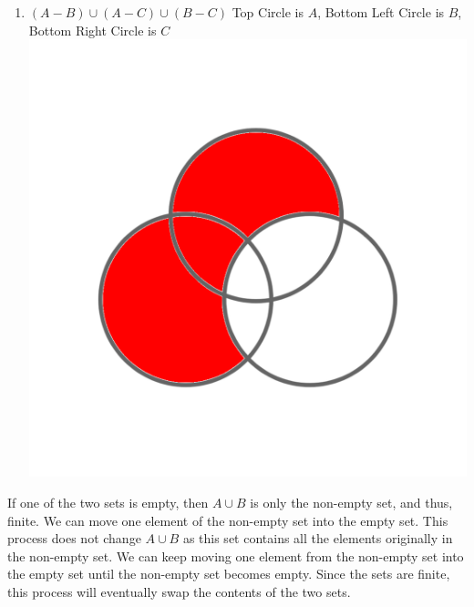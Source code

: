 \documentclass[12pt]{article}  %
\begin{document}
\begin{enumerate}
    \item $(A-B)\cup(A-C)\cup(B-C)$
    \newline
        Top Circle is $A$, Bottom Left Circle is $B$, Bottom Right Circle is $C$\newline
        \includegraphics[scale=0.20]{images/vd_3.png}
\end{enumerate}

\newline
{}\newline
If one of the two sets is empty, then $A\cup B$ is only the non-empty set, and thus, finite.
We can move one element of the non-empty set into the empty set. This process does not change $A\cup B$ as this set contains all the elements originally in the non-empty set. We can keep moving one element from the non-empty set into the empty set until the non-empty set becomes empty. Since the sets are finite, this process will eventually swap the contents of the two sets.
\end{document}
